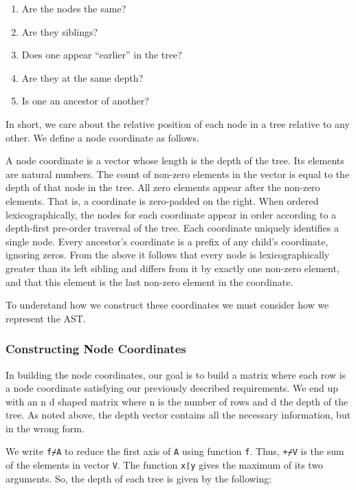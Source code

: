 \documentclass[numbers,preprint]{sigplanconf}
\begin{document}
\begin{enumerate}[noitemsep]
\item Are the nodes the same?
\item Are they siblings?
\item Does one appear ``earlier'' in the tree?
\item Are they at the same depth?
\item Is one an ancestor of another?
\end{enumerate}

In short, we care about the relative position of each node in a tree
relative to any other. We define a node coordinate as follows.

A node coordinate is a vector whose length is the depth of the
tree. Its elements are natural numbers.  The count of non-zero elements
in the vector is equal to the depth of that node in the tree. All zero
elements appear after the non-zero elements. That is, a coordinate
is zero-padded on the right. When ordered lexicographically, the
nodes for each coordinate appear in order according to a depth-first
pre-order traversal of the tree. Each coordinate uniquely identifies a
single node. Every ancestor’s coordinate is a prefix of any child’s
coordinate, ignoring zeros. From the above it follows that every node
is lexicographically greater than its left sibling and differs from
it by exactly one non-zero element, and that this element is the last
non-zero element in the coordinate.

To understand how we construct these coordinates we must consider
how we represent the AST.

\subsubsection{Constructing Node Coordinates}

In building the node coordinates, our goal is to build a matrix where
each row is a node coordinate satisfying our previously described
requirements. We end up with an n d shaped matrix where n is the number
of rows and d the depth of the tree. As noted above, the depth vector
contains all the necessary information, but in the wrong form.

We write \verb;f⌿A; to reduce the first axis of \verb;A; using function \verb;f;. Thus,
\verb;+⌿V; is the sum of the elements in vector \verb;V;. The function \verb;x⌈y;
gives the maximum of its two arguments. So, the depth of each tree
is given by the following:
\end{document}
